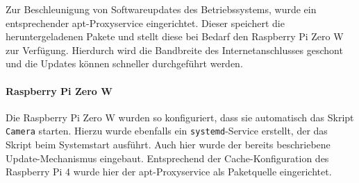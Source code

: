 \documentclass[./00PhotoBox.tex]{subfiles}
\begin{document}
Zur Beschleunigung von Softwareupdates des Betriebssystems, wurde ein entsprechender apt-Proxyservice eingerichtet. Dieser speichert die heruntergeladenen Pakete und stellt diese bei Bedarf den Raspberry Pi Zero W zur Verfügung. Hierdurch wird die Bandbreite des Internetanschlusses geschont und die Updates können schneller durchgeführt werden.

\paragraph{Raspberry Pi Zero W}
Die Raspberry Pi Zero W wurden so konfiguriert, dass sie au\-to\-ma\-tisch das Skript \texttt{Camera} starten. Hierzu wurde ebenfalls ein \texttt{systemd}-Service erstellt, der das Skript beim Systemstart ausführt. Auch hier wurde der bereits beschriebene Update-Mechanismus eingebaut. Entsprechend der Cache-Konfiguration des Raspberry Pi 4 wurde hier der apt-Proxyservice als Paketquelle eingerichtet.


\biblio
\end{document}

